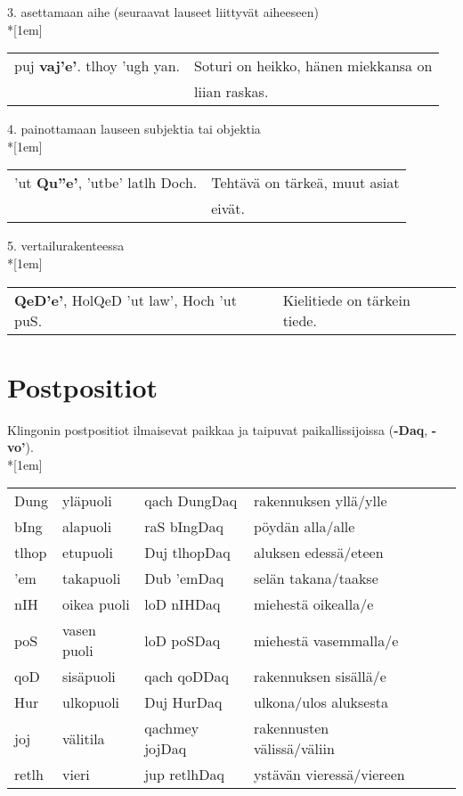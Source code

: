\documentclass{book}
\begin{document}
3. asettamaan aihe (seuraavat lauseet liittyvät aiheeseen)\\*[1em]
\begin{tabular}{l l}
    puj \textbf{vaj'e'}. tlhoy 'ugh yan. & Soturi on heikko, hänen miekkansa on \\
    & liian raskas. \\
\end{tabular}

4. painottamaan lauseen subjektia tai objektia\\*[1em]
\begin{tabular}{l l}
    'ut \textbf{Qu''e'}, 'utbe' latlh Doch. & Tehtävä on tärkeä, muut asiat \\
    & eivät. \\
\end{tabular}

5. vertailurakenteessa\\*[1em]
\begin{tabular}{l l}
    \textbf{QeD'e'}, HolQeD 'ut law', Hoch 'ut puS. & Kielitiede on tärkein tiede.
\end{tabular}

\chapter{Postpositiot}

Klingonin postpositiot ilmaisevat paikkaa ja taipuvat paikallissijoissa (\textbf{-Daq}, \textbf{-vo'}).
\\*[1em]
\begin{tabular}{Bl Il | Bl l}
    Dung & yläpuoli & qach DungDaq & rakennuksen yllä/ylle \\
    bIng & alapuoli & raS bIngDaq & pöydän alla/alle \\
    tlhop & etupuoli & Duj tlhopDaq & aluksen edessä/eteen \\
    'em & takapuoli & Dub 'emDaq & selän takana/taakse \\
    nIH & oikea puoli & loD nIHDaq & miehestä oikealla/e \\
    poS & vasen puoli & loD poSDaq & miehestä vasemmalla/e \\
    qoD & sisäpuoli & qach qoDDaq & rakennuksen sisällä/e \\
    Hur & ulkopuoli & Duj HurDaq & ulkona/ulos aluksesta \\
    joj & välitila & qachmey jojDaq & rakennusten välissä/väliin \\
    retlh & vieri & jup retlhDaq & ystävän vieressä/viereen \\
\end{tabular}
\end{document}

